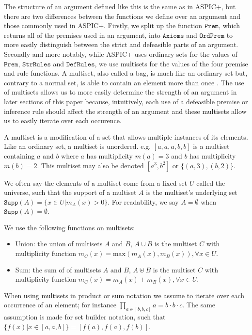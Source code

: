 \documentclass[runningheads]{llncs}
\newcommand{\Prem}{\texttt{Prem}}
\newcommand{\Ord}{\texttt{OrdPrem}}
\newcommand{\Ax}{\texttt{Axioms}}
\newcommand{\DefRules}{\texttt{DefRules}}
\newcommand{\StrRules}{\texttt{StrRules}}
\newcommand{\Supp}{\texttt{Supp}}
\begin{document}
The structure of an argument defined like this is the same as in ASPIC+, but there are two differences between the functions we define over an argument and those commonly used in ASPIC+. Firstly, we split up the function $\Prem$, which returns all of the premises used in an argument,  into $\Ax$ and $\Ord$ to more easily distinguish between the strict and defeasible parts of an argument. Secondly and more notably, while ASPIC+ uses ordinary sets for the values of $\Prem$, $\StrRules$ and $\DefRules$, we use multisets for the values of the four premise and rule functions. A multiset, also called a bag, is much like an ordinary set but, contrary to a normal set, is able to contain an element more than once \cite{DBLP:books/lib/Knuth98}. The use of multisets allows us to more easily determine the strength of an argument in later sections of this paper because, intuitively, each use of a defeasible premise or inference rule should affect the strength of an argument and these multisets allow us to easily iterate over each occurence.

\begin{definition}[Multiset]
A multiset is a modification of a set that allows multiple instances of its elements. Like an ordinary set, a multiset is unordered.
e.g. $[a,a,a,b,b]$ is a multiset containing $a$ and $b$ where $a$ has multiplicity $m(a) = 3$ and $b$ has multiplicity $m(b) = 2$. This multiset may also be denoted $[a^3,b^2]$ or $\{(a,3),(b,2)\}$.

We often say the elements of a multiset come from a fixed set $U$ called the universe, such that the support of a multiset $A$ is the multiset's underlying set $\Supp(A) = \{x \in U | m_A(x) > 0\}$. For readability, we say $A=\emptyset$ when $\Supp(A) = \emptyset$.

We use the following functions on multisets:
\begin{itemize}
\item Union: the union of multisets $A$ and $B$, $A\cup B$ is the multiset $C$ with multiplicity function $m_C(x) = \text{max}(m_A(x),m_B(x)), \forall x \in U$.
\item Sum: the sum of of multisets $A$ and $B$, $A\uplus B$ is the multiset $C$ with multiplicity function $m_C(x) = m_A(x) + m_B(x), \forall x \in U$.
\end{itemize}
When using multisets in product or sum notation we assume to iterate over each occurrence of an element; for instance $\prod_{a \in [b,b,c]}a = b \cdot b \cdot c$. The same assumption is made for set builder notation, such that $\{f(x) | x \in [a,a,b]\} = [f(a),f(a),f(b)]$.
\end{definition}
\end{document}
